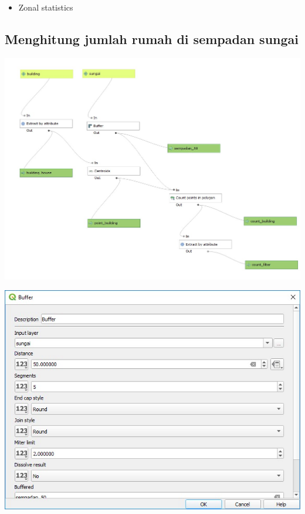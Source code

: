 \documentclass[]{book}
\providecommand{\tightlist}{%
  \setlength{\itemsep}{0pt}\setlength{\parskip}{0pt}}
\begin{document}
\begin{itemize}
\tightlist
\item
  Zonal statistics
\end{itemize}

\hypertarget{menghitung-jumlah-rumah-di-sempadan-sungai}{%
\subsection{Menghitung jumlah rumah di sempadan sungai}\label{menghitung-jumlah-rumah-di-sempadan-sungai}}

\includegraphics{./img/gismodel4.png}

\includegraphics{./img/gismodel6.png}
\end{document}
